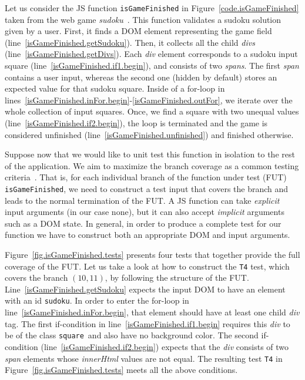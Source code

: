 Let us consider the JS function \texttt{isGameFinished} in Figure~\ref{code.isGameFinished} taken from the web game \emph{sudoku}~\cite{sudoku}. This function validates a sudoku solution given by a user. First, it finds a DOM element representing the game field (line~\ref{isGameFinished.getSudoku}). Then, it collects all the child \emph{divs} (line~\ref{isGameFinished.getDivs}). Each \emph{div} element corresponds to a sudoku input square (line~\ref{isGameFinished.if1.begin}), and consists of two \emph{spans}. The first \emph{span} contains a user input, whereas the second one (hidden by default) stores an expected value for that sudoku square. Inside of a for-loop in lines~\ref{isGameFinished.inFor.begin}-\ref{isGameFinished.outFor}, we iterate over the whole collection of input squares. Once, we find a square with two unequal values (line~\ref{isGameFinished.if2.begin}), the loop is terminated and the game is considered unfinished (line~\ref{isGameFinished.unfinished}) and finished otherwise.

Suppose now that we would like to unit test this function in isolation to the rest of the application. We aim to maximize the branch coverage as a common testing criteria~\cite{zhu1997software}. That is, for each individual branch of the function under test (FUT) \texttt{isGameFinished}, we need to construct a test input that covers the branch and leads to the normal termination of the FUT. A JS function can take \emph{explicit} input arguments (in our case none), but it can also accept \emph{implicit} arguments such as a DOM state. In general, in order to produce a complete test for our function we have to construct both an appropriate DOM and input arguments.


Figure~\ref{fig.isGameFinished.tests} presents four tests that together provide the full coverage of the FUT. Let us take a look at how to construct the \texttt{T4} test, which covers the branch $(10,11)$, by following the structure of the FUT. Line~\ref{isGameFinished.getSudoku} expects the input DOM to have an element with an id \textquotesingle\texttt{sudoku}\textquotesingle. In order to enter the for-loop in line~\ref{isGameFinished.inFor.begin}, that element should have at least one child \emph{div} tag. The first if-condition in line~\ref{isGameFinished.if1.begin} requires this \emph{div} to be of the class \textquotesingle\texttt{square}\textquotesingle\ and also have no background color. The second if-condition (line~\ref{isGameFinished.if2.begin}) expects that the \emph{div} consists of two \emph{span} elements whose \emph{innerHtml} values are not equal. The resulting test \texttt{T4} in Figure~\ref{fig.isGameFinished.tests} meets all the above conditions.

